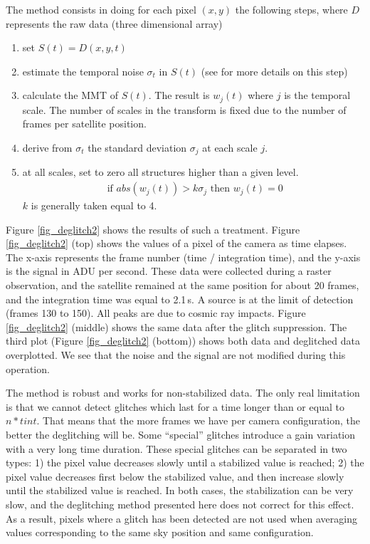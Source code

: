 The method consists
in doing for each pixel $(x,y)$ the following steps,
where $D$ represents  the raw data (three dimensional array) 
\begin{enumerate}
\item set $S(t) = D(x,y,t)$
\item estimate the temporal noise $\sigma_t$ in $S(t)$ 
(see \cite{starck:book98} for more details on this step) 
\item calculate the MMT of $S(t)$. The result is  $w_j(t)$ where $j$ is the 
temporal scale. The number of scales in the transform is fixed due to the
number of frames per satellite position.
\item derive from $\sigma_t$ the standard deviation $\sigma_j$ at each
scale $j$.
\item at all scales, set to zero all structures higher than a given level.
\begin{eqnarray}
\mbox{ if } abs(w_j(t)) > k \sigma_j \mbox{ then } w_j(t) = 0
\end{eqnarray}
$k$ is generally taken equal to 4.
\end{enumerate}


Figure \ref{fig_deglitch2} shows the results of such a
treatment. Figure \ref{fig_deglitch2} (top) shows the values of
a pixel of the camera as time elapses. The x-axis represents the frame
number (time / integration time), and the y-axis is the signal in ADU per
second. These data were collected during a raster observation, and the
satellite remained at the same position for about 20 frames, and the
integration time was equal to 2.1\,s. A source is at the limit of
detection (frames 130 to 150). All peaks are due to cosmic ray
impacts. Figure \ref{fig_deglitch2}
(middle) shows the same data after the glitch suppression.  The third
plot (Figure \ref{fig_deglitch2} (bottom)) shows both data and
deglitched data overplotted.  We see that the noise and the signal are
not modified during this operation.

The method is robust and works for non-stabilized data. The only real
limitation is that we cannot detect glitches which last for a time
longer than or equal to $n*tint$. That means that the more frames we
have per camera configuration, the better the deglitching will
be. Some ``special'' glitches introduce a gain variation with a very
long time duration. These special glitches can be separated in two
types: 1) the pixel value decreases
slowly until a stabilized value is reached; 2) the pixel value
decreases first below the stabilized value, and then increase slowly
until the stabilized value is reached.  
In both cases, the stabilization can be
very slow, and the deglitching method presented here does
not correct for this effect.  As a result, pixels where a glitch has been
detected are not used when averaging values corresponding to the same
sky position and same configuration.


